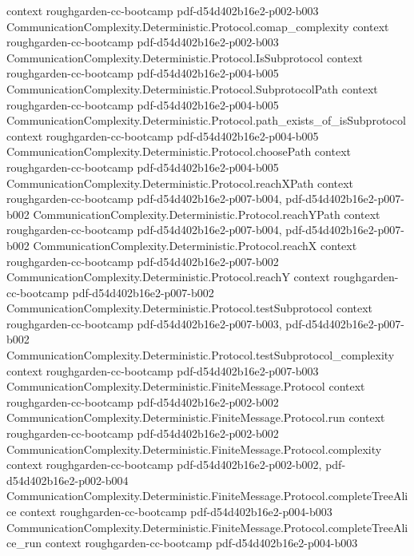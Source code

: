 \begin{theorem}
  {context}
  {roughgarden-cc-bootcamp}
  {pdf-d54d402b16e2-p002-b003}
\proofstep
  {CommunicationComplexity.Deterministic.Protocol.comap_complexity}
  {context}
  {roughgarden-cc-bootcamp}
  {pdf-d54d402b16e2-p002-b003}
\proofstep
  {CommunicationComplexity.Deterministic.Protocol.IsSubprotocol}
  {context}
  {roughgarden-cc-bootcamp}
  {pdf-d54d402b16e2-p004-b005}
\proofstep
  {CommunicationComplexity.Deterministic.Protocol.SubprotocolPath}
  {context}
  {roughgarden-cc-bootcamp}
  {pdf-d54d402b16e2-p004-b005}
\proofstep
  {CommunicationComplexity.Deterministic.Protocol.path_exists_of_isSubprotocol}
  {context}
  {roughgarden-cc-bootcamp}
  {pdf-d54d402b16e2-p004-b005}
\proofstep
  {CommunicationComplexity.Deterministic.Protocol.choosePath}
  {context}
  {roughgarden-cc-bootcamp}
  {pdf-d54d402b16e2-p004-b005}
\proofstep
  {CommunicationComplexity.Deterministic.Protocol.reachXPath}
  {context}
  {roughgarden-cc-bootcamp}
  {pdf-d54d402b16e2-p007-b004,
    pdf-d54d402b16e2-p007-b002}
\proofstep
  {CommunicationComplexity.Deterministic.Protocol.reachYPath}
  {context}
  {roughgarden-cc-bootcamp}
  {pdf-d54d402b16e2-p007-b004,
    pdf-d54d402b16e2-p007-b002}
\proofstep
  {CommunicationComplexity.Deterministic.Protocol.reachX}
  {context}
  {roughgarden-cc-bootcamp}
  {pdf-d54d402b16e2-p007-b002}
\proofstep
  {CommunicationComplexity.Deterministic.Protocol.reachY}
  {context}
  {roughgarden-cc-bootcamp}
  {pdf-d54d402b16e2-p007-b002}
\proofstep
  {CommunicationComplexity.Deterministic.Protocol.testSubprotocol}
  {context}
  {roughgarden-cc-bootcamp}
  {pdf-d54d402b16e2-p007-b003,
    pdf-d54d402b16e2-p007-b002}
\proofstep
  {CommunicationComplexity.Deterministic.Protocol.testSubprotocol_complexity}
  {context}
  {roughgarden-cc-bootcamp}
  {pdf-d54d402b16e2-p007-b003}
\proofstep
  {CommunicationComplexity.Deterministic.FiniteMessage.Protocol}
  {context}
  {roughgarden-cc-bootcamp}
  {pdf-d54d402b16e2-p002-b002}
\proofstep
  {CommunicationComplexity.Deterministic.FiniteMessage.Protocol.run}
  {context}
  {roughgarden-cc-bootcamp}
  {pdf-d54d402b16e2-p002-b002}
\proofstep
  {CommunicationComplexity.Deterministic.FiniteMessage.Protocol.complexity}
  {context}
  {roughgarden-cc-bootcamp}
  {pdf-d54d402b16e2-p002-b002,
    pdf-d54d402b16e2-p002-b004}
\proofstep
  {CommunicationComplexity.Deterministic.FiniteMessage.Protocol.completeTreeAlice}
  {context}
  {roughgarden-cc-bootcamp}
  {pdf-d54d402b16e2-p004-b003}
\proofstep
  {CommunicationComplexity.Deterministic.FiniteMessage.Protocol.completeTreeAlice_run}
  {context}
  {roughgarden-cc-bootcamp}
  {pdf-d54d402b16e2-p004-b003}

\end{theorem}
